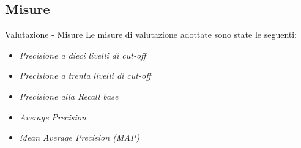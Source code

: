 \subsection{Misure}
\begin{frame}{Valutazione - Misure}
	Le misure di valutazione adottate sono state le seguenti:
	\begin{itemize}
		\item \textit{Precisione a dieci livelli di cut-off}
		\item \textit{Precisione a trenta livelli di cut-off}
		\item \textit{Precisione alla Recall base}
		\item \textit{Average Precision}
		\item \textit{Mean Average Precision (MAP)}
	\end{itemize}

	
\end{frame}